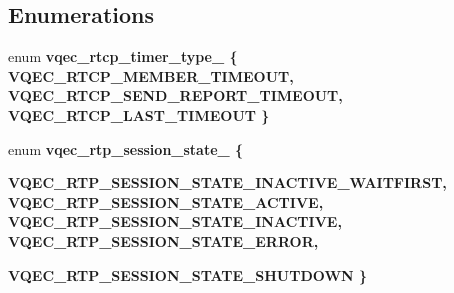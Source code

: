 \subsection*{Enumerations}
\begin{CompactItemize}
\item 
enum \bf{vqec\_\-rtcp\_\-timer\_\-type\_\-} \{ \bf{VQEC\_\-RTCP\_\-MEMBER\_\-TIMEOUT}, 
\bf{VQEC\_\-RTCP\_\-SEND\_\-REPORT\_\-TIMEOUT}, 
\bf{VQEC\_\-RTCP\_\-LAST\_\-TIMEOUT}
 \}
\item 
enum \bf{vqec\_\-rtp\_\-session\_\-state\_\-} \{ \par
\bf{VQEC\_\-RTP\_\-SESSION\_\-STATE\_\-INACTIVE\_\-WAITFIRST}, 
\bf{VQEC\_\-RTP\_\-SESSION\_\-STATE\_\-ACTIVE}, 
\bf{VQEC\_\-RTP\_\-SESSION\_\-STATE\_\-INACTIVE}, 
\bf{VQEC\_\-RTP\_\-SESSION\_\-STATE\_\-ERROR}, 
\par
\bf{VQEC\_\-RTP\_\-SESSION\_\-STATE\_\-SHUTDOWN}
 \}
\end{CompactItemize}
